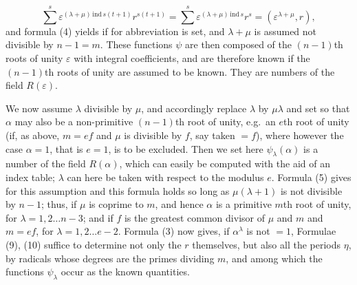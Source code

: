 \[ \sum^{s} \varepsilon^{(\lambda+\mu)\,\mathrm{ind}\,s(t+1)} r^{s(t+1)} = \sum^{s} \varepsilon^{(\lambda+\mu)\,\mathrm{ind}\,s} r^s = (\varepsilon^{\lambda+\mu}, r), \]
and formula (4) yields
if for abbreviation
is set, and $\lambda + \mu$ is assumed not divisible by $n - 1 = m$.
These functions $\psi$ are then composed of the $(n-1)$th roots of unity
$\varepsilon$ with integral coefficients, and are therefore
known if the $(n-1)$th roots of unity are assumed to be known.
They are numbers of the field $R(\varepsilon)$.

We now assume $\lambda$ divisible by $\mu$, and accordingly replace $\lambda$
by $\mu\lambda$ and set
so that $\alpha$ may also be a non-primitive $(n-1)$th root of unity,
e.g.\ an $e$th root of unity (if, as above, $m = ef$
and $\mu$ is divisible by $f$, say taken $= f$), where
however the case $\alpha = 1$, that is $e = 1$, is to be excluded.
Then we set
here $\psi_\lambda(\alpha)$ is a number of the field $R(\alpha)$, which can easily
be computed with the aid of an index table; $\lambda$ can here be taken
with respect to the modulus $e$. Formula (5) gives for this
assumption
and this formula holds so long as $\mu(\lambda+1)$ is not divisible by $n - 1$;
thus, if $\mu$ is coprime to $m$, and hence $\alpha$ is a
primitive $m$th root of unity, for $\lambda = 1, 2 \ldots n-3$; and
if $f$ is the greatest common divisor of $\mu$ and $m$ and
$m = ef$, for $\lambda = 1, 2 \ldots e-2$.
Formula (3) now gives, if $\alpha^\lambda$ is not $= 1$,
Formulae (9), (10) suffice to determine not only the $r$ themselves,
but also all the periods $\eta$, by radicals
whose degrees are the primes dividing $m$,
and among which the functions $\psi_\lambda$ occur as the known
quantities.

